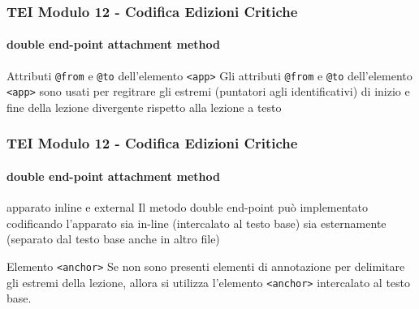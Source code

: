 \begin{frame}
    \frametitle{TEI Modulo 12 - Codifica Edizioni Critiche}
    \framesubtitle{double end-point attachment method}
    \addtocounter{nframe}{1}
    



    \begin{block}{Attributi \texttt{@from} e \texttt{@to} dell'elemento \texttt{<app>}}
      Gli attributi \texttt{@from} e \texttt{@to} dell'elemento \texttt{<app>} sono usati per regitrare gli estremi (puntatori agli identificativi) di inizio e fine della lezione divergente rispetto alla lezione a testo
    \end{block}
    

\end{frame}


\begin{frame}
    \frametitle{TEI Modulo 12 - Codifica Edizioni Critiche}
    \framesubtitle{double end-point attachment method}
    \addtocounter{nframe}{1}
    


   

    \begin{block}{apparato inline e external}
      Il metodo double end-point può implementato codificando l'apparato sia in-line (intercalato al testo base) sia esternamente (separato dal testo base anche in altro file)  
    \end{block}
    
    \begin{block}{Elemento \texttt{<anchor>}}
        Se non sono presenti elementi di annotazione per delimitare gli estremi della lezione, allora si utilizza l'elemento \texttt{<anchor>} intercalato al testo base.
     \end{block}

\end{frame}



